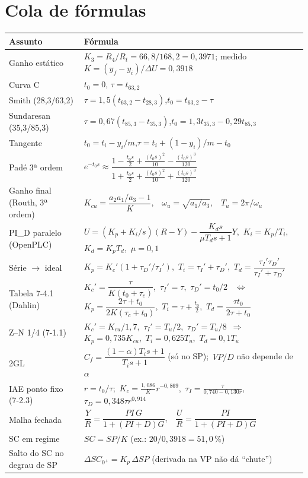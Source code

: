 \documentclass[11pt,a4paper]{article}
\begin{document}
\section{Cola de fórmulas}
\begin{center}\small
\renewcommand{\arraystretch}{1.5}
\begin{longtable}{p{3.6cm}p{11.2cm}}
\toprule \textbf{Assunto} & \textbf{Fórmula}\\\midrule\endhead
Ganho estático & $K_3=R_4/R_t=66{,}8/168{,}2=0{,}3971$; medido $K=(y_f-y_i)/\Delta U=0{,}3918$\\
Curva C & $t_0=0$, $\tau=t_{63,2}$\\
Smith (28,3/63,2) & $\tau=1{,}5(t_{63,2}-t_{28,3})$,\quad $t_0=t_{63,2}-\tau$\\
Sundaresan (35,3/85,3) & $\tau=0{,}67(t_{85,3}-t_{35,3})$,\quad $t_0=1{,}3t_{35,3}-0{,}29t_{85,3}$\\
Tangente & $t_0=t_i-y_i/m$,\quad $\tau=t_i+(1-y_i)/m-t_0$\\
Padé 3ª ordem & $e^{-t_0s}\approx\dfrac{1-\frac{t_0s}2+\frac{(t_0s)^2}{10}-\frac{(t_0s)^3}{120}}{1+\frac{t_0s}2+\frac{(t_0s)^2}{10}+\frac{(t_0s)^3}{120}}$\\
Ganho final (Routh, 3ª ordem) & $K_{cu}=\dfrac{a_2a_1/a_3-1}{K}$,\ \ $\omega_u=\sqrt{a_1/a_3}$,\ \ $T_u=2\pi/\omega_u$\\
PI\_D paralelo (OpenPLC) & $U=(K_p+K_i/s)(R-Y)-\dfrac{K_ds}{\mu T_ds+1}Y$,\ $K_i=K_p/T_i$,\ $K_d=K_pT_d$,\ $\mu=0{,}1$\\
Série $\to$ ideal & $K_p=K_c'(1+\tau_D'/\tau_I')$,\ $T_i=\tau_I'+\tau_D'$,\ $T_d=\dfrac{\tau_I'\tau_D'}{\tau_I'+\tau_D'}$\\
Tabela 7-4.1 (Dahlin) & $K_c'=\dfrac{\tau}{K(t_0+\tau_c)}$,\ $\tau_I'=\tau$,\ $\tau_D'=t_0/2$ \ $\Leftrightarrow$\ $K_p=\dfrac{2\tau+t_0}{2K(\tau_c+t_0)}$,\ $T_i=\tau+\frac{t_0}2$,\ $T_d=\dfrac{\tau t_0}{2\tau+t_0}$\\
Z--N 1/4 (7-1.1) & $K_c'=K_{cu}/1{,}7$,\ $\tau_I'=T_u/2$,\ $\tau_D'=T_u/8$\ $\Rightarrow$\ $K_p=0{,}735K_{cu}$,\ $T_i=0{,}625T_u$,\ $T_d=0{,}1T_u$\\
2GL & $C_f=\dfrac{(1-\alpha)T_is+1}{T_is+1}$ (só no SP);\ $VP/D$ não depende de $\alpha$\\
IAE ponto fixo (7-2.3) & $r=t_0/\tau$;\ $K_c=\frac{1{,}086}{K}r^{-0{,}869}$,\ $\tau_I=\frac{\tau}{0{,}740-0{,}130r}$,\ $\tau_D=0{,}348\tau r^{0{,}914}$\\
Malha fechada & $\dfrac YR=\dfrac{PI\,G}{1+(PI+D)G}$,\ \ $\dfrac UR=\dfrac{PI}{1+(PI+D)G}$\\
SC em regime & $SC=SP/K$ (ex.: $20/0{,}3918=51{,}0\,\%$)\\
Salto do SC no degrau de SP & $\Delta SC_{0^+}=K_p\,\Delta SP$ (derivada na VP não dá ``chute'')\\
\bottomrule
\end{longtable}\end{center}
\end{document}
